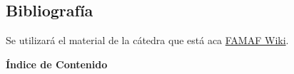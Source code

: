 \documentclass{article}
\begin{document}
\subsection*{Bibliografía}
Se utilizará el material de la cátedra que está aca \href{https://wiki.cs.famaf.unc.edu.ar/doku.php?id=algo2:main:2022}{FAMAF Wiki}.
\newpage


\thispagestyle{empty}
\begin{center}
    \huge \textbf{Índice de Contenido}
\end{center}

\noindent\makebox[\linewidth]{\rule{\textwidth}{0.4pt}}

\startcontents
{}
\newpage






\end{document}
